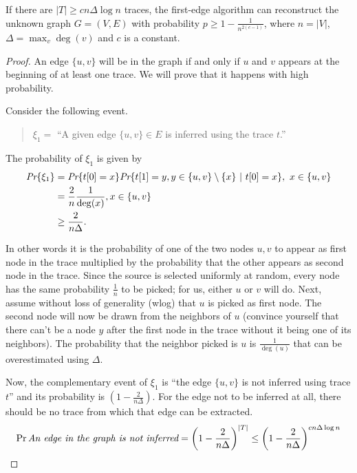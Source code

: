  \begin{thm}
 	 If there are $|T| \geq cn\Delta\log n$ traces, the first-edge algorithm can reconstruct the unknown graph $G=(V, E)$ with probability $p \geq 1 - \frac{1}{n^{2(c-1)}}$, where $n = |V|$, $\Delta = \max_v \deg(v)$ and $c$ is a constant.
 \end{thm}
\begin{proof}
	An edge $\{u, v\}$ will be in the graph if and only if $u$ and $v$ appears at the beginning of at least one trace. We will prove that it happens with high probability.
	
	Consider the following event.
	\begin{quotation}
		$\xi_1 =$ ``A given edge $\{u, v\} \in E$ is inferred using the trace $t$.''
	\end{quotation}
	
	The probability of $\xi_1$ is given by
	\begin{align}
	\emph{Pr}\{\xi_1\} &= \emph{Pr}\{t[0] = x\}\emph{Pr}\{t[1] = y, y\in \{u, v\}\setminus\{x\}\ |\ t[0] = x\},\  x\in \{u, v\}\\
	&= \frac{2}{n}\frac{1}{\deg(x)}, x \in \{u, v\}\\
	&\geq \frac{2}{n\Delta}.
	\end{align}
	
	In other words it is the probability of one of the two nodes $u, v$ to appear as first node in the trace multiplied by the probability that the other appears as second node in the trace. Since the source is selected uniformly at random, every node has the same probability $\frac{1}{n}$ to be picked; for us, either $u$ or $v$ will do. Next, assume without loss of generality (wlog) that $u$ is picked as first node. The second node will now be drawn from the neighbors of $u$ (convince yourself that there can't be a node $y$ after the first node in the trace without it being one of its neighbors). The probability that the neighbor picked is $u$ is $\frac{1}{\deg(u)}$ that can be overestimated using $\Delta$.
	
	Now, the complementary event of $\xi_1$ is ``the edge $\{u,v\}$ is not inferred using trace $t$'' and its probability is $(1 - \frac{2}{n\Delta})$. For the edge not to be inferred at all, there should be no trace from which that edge can be extracted.
	\begin{equation}
	\Pr{\emph{An edge in the graph is not inferred}} = \left(1- \frac{2}{n\Delta}\right)^{|T|} \leq \left(1- \frac{2}{n\Delta}\right)^{cn\Delta\log n} 
	\end{equation}
	

\end{proof}
